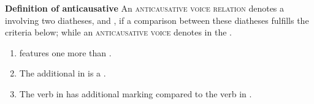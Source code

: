 \noindent
\begin{center}
	\begin{minipage}{0.80\textwidth}
		\textbf{Definition of anticausative} \newline
		An \textsc{anticausative voice relation} denotes a  involving two diatheses,  and , if a comparison between these diatheses fulfills the criteria below; while an \textsc{anticausative voice} denotes  in the .
		\begin{enumerate}[label=\roman*)]
			\item {} features one  more than .
			\item The additional  in  is a .
			\item The verb in  has additional marking compared to the verb in .
		\end{enumerate}
	\end{minipage}
\end{center}

\smallskip

